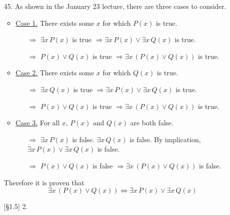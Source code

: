 \documentclass{article}
\begin{document}
\begin{enumerate}
    \item[45.] As shown in the January 23 lecture, there are three cases to consider.
        \begin{itemize}
            \item \underline{Case 1.} There exists some $x$ for which $P(x)$ is true.
            \begin{itemize}
                \item[$\Rightarrow$] $\exists x \, P(x)$ is true $\Rightarrow \exists x \, P(x) \lor \exists x \, Q(x)$ is true.
                \item[$\Rightarrow$] $P(x) \lor Q(x)$ is true $\Rightarrow \exists x \, \left( P(x) \lor Q(x) \right)$ is true.
            \end{itemize}
            \item \underline{Case 2.} There exists some $x$ for which $Q(x)$ is true.
            \begin{itemize}
                \item[$\Rightarrow$] $\exists x \, Q(x)$ is true $\Rightarrow \exists x \, P(x) \lor \exists x \, Q(x)$ is true.
                \item[$\Rightarrow$] $P(x) \lor Q(x)$ is true $\Rightarrow \exists x \, \left( P(x) \lor Q(x) \right)$ is true.
            \end{itemize}
            \item \underline{Case 3.} For all $x$, $P(x)$ and $Q(x)$ are both false.
            \begin{itemize}
                \item[$\Rightarrow$] $\exists x \, P(x)$ is false. $\exists x \, Q(x)$ is false. By implication, $\exists x \, P(x) \lor \exists x \, Q(x)$ is false.
                \item[$\Rightarrow$] $P(x) \lor Q(x)$ is false $\Rightarrow \exists x \, \left( P(x) \lor Q(x) \right)$ is false.
            \end{itemize}
        \end{itemize}
    Therefore it is proven that
    \[
    \exists x \, \left( P(x) \lor Q(x) \right) \Longleftrightarrow \exists x \, P(x) \lor \exists x \, Q(x)
    \]
    \item[{[\S 1.5]} 2.]
        \begin{itemize}

\end{itemize}
\end{enumerate}
\end{document}

